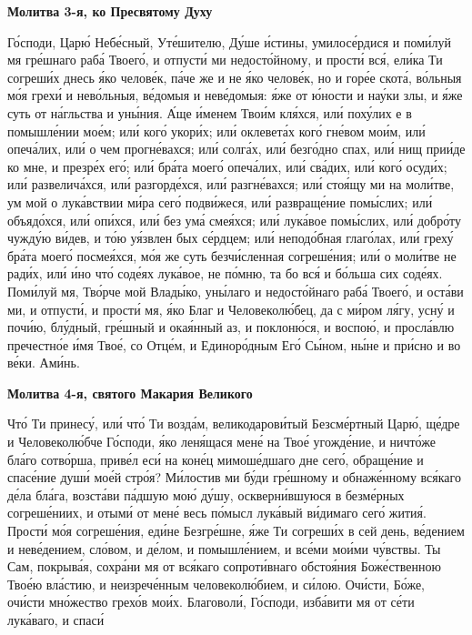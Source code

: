  

\bfseries Молитва 3-я, ко Пресвятому Духу\normalfont{}


   Го́споди, Царю́ Небе́сный, Уте́шителю, Ду́ше и́стины, умилосе́рдися и
поми́луй мя гре́шнаго раба́ Твоего́, и отпусти́ ми недосто́йному, и прости́ вся́,
ели́ка Ти согреши́х днесь я́ко челове́к, па́че же и не я́ко челове́к, но и горе́е
скота́, во́льныя мо́я грехи́ и нево́льныя, ве́домыя и неве́домыя: я́же от ю́ности
и нау́ки злы, и я́же суть от на́гльства и уны́ния. А́ще и́менем Твои́м кля́хся,
или́ поху́лих е в помышле́нии мое́м; или́ кого́ укори́х; или́ оклевета́х кого́
гне́вом мои́м, или́ опеча́лих, или́ о чем прогне́вахся; или́ солга́х, или́ безго́дно
спах, или́ нищ прии́де ко мне, и презре́х его́; или́ бра́та моего́ опеча́лих, или́
сва́дих, или́ кого́ осуди́х; или́ развелича́хся, или́ разгорде́хся, или́
разгне́вахся; или́ стоя́щу ми на моли́тве, ум мой о лука́вствии ми́ра сего́
подви́жеся, или́ развраще́ние помы́слих; или́ объядо́хся, или́ опи́хся,
или́ без ума́ смея́хся; или́ лука́вое помы́слих, или́ добро́ту чужду́ю
ви́дев, и то́ю уя́звлен бых се́рдцем; или́ неподо́бная глаго́лах, или́ греху́
бра́та моего́ посмея́хся, мо́я же суть безчи́сленная согреше́ния; или́ о
моли́тве не ради́х, или́ и́но что́ соде́ях лука́вое, не по́мню, та бо вся́ и
бо́льша сих соде́ях. Поми́луй мя, Тво́рче мой Влады́ко, уны́лаго и
недосто́йнаго раба́ Твоего́, и оста́ви ми, и отпусти́, и прости́ мя, я́ко Благ и
Человеколю́бец, да с ми́ром ля́гу, усну́ и почи́ю, блу́дный, гре́шный и
окая́нный аз, и поклоню́ся, и воспою́, и просла́влю пречестно́е и́мя
Твое́, со Отце́м, и Единоро́дным Его́ Сы́ном, ны́не и при́сно и во ве́ки.
Ами́нь.



 

\bfseries Молитва 4-я, святого Макария Великого\normalfont{}


   Что́ Ти принесу́, или́ что́ Ти возда́м, великодарови́тый Безсме́ртный
Царю́, ще́дре и Человеколю́бче Го́споди, я́ко леня́щася мене́ на Твое́
угожде́ние, и ничто́же бла́го сотво́рша, приве́л еси́ на коне́ц мимоше́дшаго
дне сего́, обраще́ние и спасе́ние души́ мое́й стро́я? Ми́лостив ми бу́ди
гре́шному и обнаже́нному вся́каго де́ла бла́га, возста́ви па́дшую мою́ ду́шу,
оскверни́вшуюся в безме́рных согреше́ниих, и отыми́ от мене́ весь по́мысл
лука́вый ви́димаго сего́ жития́. Прости́ мо́я согреше́ния, еди́не Безгре́шне,
я́же Ти согреши́х в сей день, ве́дением и неве́дением, сло́вом, и де́лом, и
помышле́нием, и все́ми мои́ми чу́вствы. Ты Сам, покрыва́я, сохра́ни мя от
вся́каго сопроти́внаго обстоя́ния Боже́ственною Твое́ю вла́стию, и
неизрече́нным человеколю́бием, и си́лою. Очи́сти, Бо́же, очи́сти мно́жество
грехо́в мои́х. Благоволи́, Го́споди, изба́вити мя от се́ти лука́ваго, и спаси́

